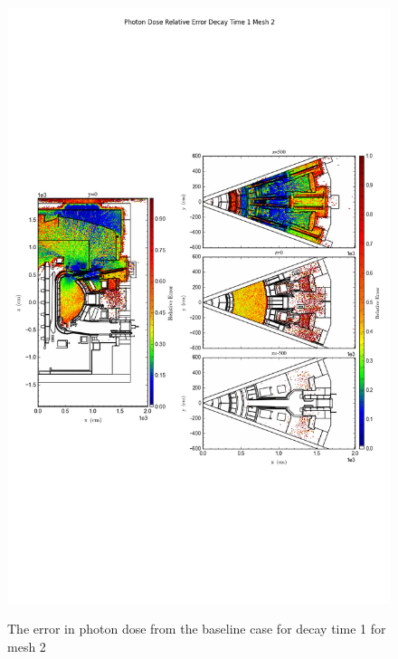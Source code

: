 \begin{figure}[ht!]
\centering
\includegraphics[trim={0cm 9cm 0cm 10cm},clip,scale=0.75]{../plots/final_model/Photon_Dose_Relative_Error_Decay_Time_1_Mesh_2.png}
\label{fig:photons_dc1_no4bc_m2_error}
\caption{The error in photon dose from the baseline case for decay time 1 for mesh 2}
\end{figure}

